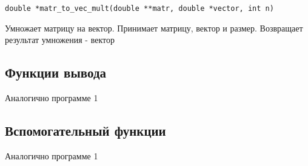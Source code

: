 \documentclass[a4paper,12pt,titlepage,finall]{article}
\begin{document}
\begin{verbatim}
double *matr_to_vec_mult(double **matr, double *vector, int n)
\end{verbatim}

Умножает матрицу на вектор. Принимает матрицу, вектор и размер. Возвращает результат умножения - вектор

\subsection{Функции вывода}

Аналогично программе 1

\subsection{Вспомогательный функции}

Аналогично программе 1

\newpage
\end{document}

